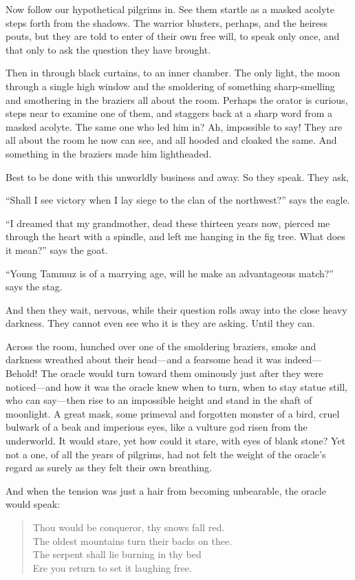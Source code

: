 Now follow our hypothetical pilgrims in. See them startle as a masked acolyte steps forth from the shadows. The warrior blusters, perhaps, and the heiress pouts, but they are told to enter of their own free will, to speak only once, and that only to ask the question they have brought.

Then in through black curtains, to an inner chamber. The only light, the moon through a single high window and the smoldering of something sharp-smelling and smothering in the braziers all about the room. Perhaps the orator is curious, steps near to examine one of them, and staggers back at a sharp word from a masked acolyte. The same one who led him in? Ah, impossible to say! They are all about the room he now can see, and all hooded and cloaked the same. And something in the braziers made him lightheaded.

Best to be done with this unworldly business and away. So they speak. They ask,

``Shall I see victory when I lay siege to the clan of the northwest?'' says the eagle.

``I dreamed that my grandmother, dead these thirteen years now, pierced me through the heart with a spindle, and left me hanging in the fig tree. What does it mean?'' says the goat.

``Young Tammuz is of a marrying age, will he make an advantageous match?'' says the stag.

And then they wait, nervous, while their question rolls away into the close heavy darkness. They cannot even see who it is they are asking. Until they can.

Across the room, hunched over one of the smoldering braziers, smoke and darkness wreathed about their head---and a fearsome head it was indeed---Behold! The oracle would turn toward them ominously just after they were noticed---and how it was the oracle knew when to turn, when to stay statue still, who can say---then rise to an impossible height and stand in the shaft of moonlight. A great mask, some primeval and forgotten monster of a bird, cruel bulwark of a beak and imperious eyes, like a vulture god risen from the underworld. It would stare, yet how could it stare, with eyes of blank stone? Yet not a one, of all the years of pilgrims, had not felt the weight of the oracle's regard as surely as they felt their own breathing.

And when the tension was just a hair from becoming unbearable, the oracle would speak:

\begin{verse}
Thou would be conqueror, thy snows fall red. \\
The oldest mountains turn their backs on thee. \\
The serpent shall lie burning in thy bed \\
Ere you return to set it laughing free.
\end{verse}

